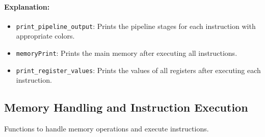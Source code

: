 \documentclass{article}
\begin{document}
\paragraph{Explanation:}
\begin{itemize}
    \item \texttt{print\_pipeline\_output}: Prints the pipeline stages for each instruction with appropriate colors.
    \item \texttt{memoryPrint}: Prints the main memory after executing all instructions.
    \item \texttt{print\_register\_values}: Prints the values of all registers after executing each instruction.
\end{itemize}

\newpage
\subsection{Memory Handling and Instruction Execution}
Functions to handle memory operations and execute instructions.
\end{document}
